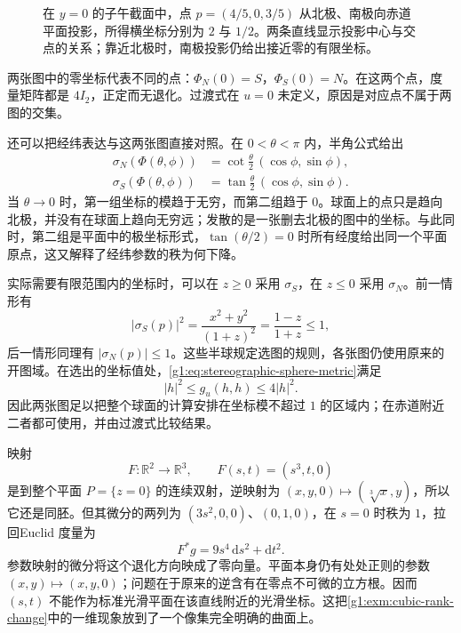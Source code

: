 \begin{figure}[htbp]
	\centering
	
	\caption[两张立体投影图的覆盖]{在 \(y=0\) 的子午截面中，点 \(p=(4/5,0,3/5)\) 从北极、南极向赤道平面投影，所得横坐标分别为 \(2\) 与 \(1/2\)。两条直线显示投影中心与交点的关系；靠近北极时，南极投影仍给出接近零的有限坐标。}
	\label{g1:fig:stereographic-chart-coverage}
\end{figure}

两张图中的零坐标代表不同的点：\(\Phi_N(0)=S\)，\(\Phi_S(0)=N\)。在这两个点，度量矩阵都是 \(4I_2\)，正定而无退化。过渡式在 \(u=0\) 未定义，原因是对应点不属于两图的交集。

\ProseParagraphBreak

还可以把经纬表达与这两张图直接对照。在 \(0<\theta<\pi\) 内，半角公式给出
\[
	\begin{aligned}
		\sigma_N(\Phi(\theta,\phi))
		&=\cot\frac\theta2\,(\cos\phi,\sin\phi),\\
		\sigma_S(\Phi(\theta,\phi))
		&=\tan\frac\theta2\,(\cos\phi,\sin\phi).
	\end{aligned}
\]
当 \(\theta\to0\) 时，第一组坐标的模趋于无穷，而第二组趋于 \(0\)。球面上的点只是趋向北极，并没有在球面上趋向无穷远；发散的是一张删去北极的图中的坐标。与此同时，第二组是平面中的极坐标形式，\(\tan(\theta/2)=0\) 时所有经度给出同一个平面原点，这又解释了经纬参数的秩为何下降。

\ProseParagraphBreak

实际需要有限范围内的坐标时，可以在 \(z\ge0\) 采用 \(\sigma_S\)，在 \(z\le0\) 采用 \(\sigma_N\)。前一情形有
\[
	|\sigma_S(p)|^2=\frac{x^2+y^2}{(1+z)^2}
	=\frac{1-z}{1+z}\le1,
\]
后一情形同理有 \(|\sigma_N(p)|\le1\)。这些半球规定选图的规则，各张图仍使用原来的开图域。在选出的坐标值处，\eqref{g1:eq:stereographic-sphere-metric}满足
\[
	|h|^2\le g_u(h,h)\le4|h|^2.
\]
因此两张图足以把整个球面的计算安排在坐标模不超过 \(1\) 的区域内；在赤道附近二者都可使用，并由过渡式比较结果。

\begin{example}
	\label{g1:exm:cubic-plane-parametrization}
	映射
	\[
		F:\mathbb R^2\longrightarrow\mathbb R^3,\qquad
		F(s,t)=(s^3,t,0)
	\]
	是到整个平面 \(P=\{z=0\}\) 的连续双射，逆映射为 \((x,y,0)\mapsto(\sqrt[3]{x},y)\)，所以它还是同胚。但其微分的两列为 \((3s^2,0,0)\)、\((0,1,0)\)，在 \(s=0\) 时秩为 \(1\)，拉回Euclid 度量为
	\[
		F^*g=9s^4\,\mathrm{d}s^2+\mathrm{d}t^2.
	\]
	参数映射的微分将这个退化方向映成了零向量。平面本身仍有处处正则的参数 \((x,y)\mapsto(x,y,0)\)；问题在于原来的逆含有在零点不可微的立方根。因而 \((s,t)\) 不能作为标准光滑平面在该直线附近的光滑坐标。这把\cref{g1:exm:cubic-rank-change}中的一维现象放到了一个像集完全明确的曲面上。
\end{example}

